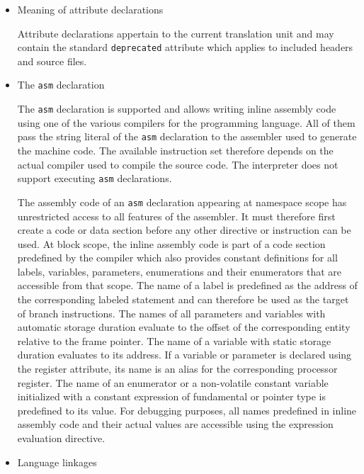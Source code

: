 \label{sec:cppdeclarations}

\begin{itemize}

\item Meaning of attribute declarations 

Attribute declarations appertain to the current translation unit and may contain the standard \texttt{deprecated} attribute which applies to included headers and source files.

\item The \texttt{asm} declaration 

The \texttt{asm} declaration is supported and allows writing inline assembly code using one of the various compilers for the \cpp{} programming language.
All of them pass the string literal of the \texttt{asm} declaration to the assembler used to generate the machine code.
The available instruction set therefore depends on the actual compiler used to compile the source code.
\seeassembly
The interpreter does not support executing \texttt{asm} declarations.

The assembly code of an \texttt{asm} declaration appearing at namespace scope has unrestricted access to all features of the assembler.
It must therefore first create a code or data section before any other directive or instruction can be used.
At block scope, the inline assembly code is part of a code section predefined by the compiler which also provides constant definitions for all labels, variables, parameters, enumerations and their enumerators that are accessible from that scope.
The name of a label is predefined as the address of the corresponding labeled statement and can therefore be used as the target of branch instructions.
The names of all parameters and variables with automatic storage duration evaluate to the offset of the corresponding entity relative to the frame pointer.
The name of a variable with static storage duration evaluates to its address.
If a variable or parameter is declared using the register attribute, its name is an alias for the corresponding processor register.
The name of an enumerator or a non-volatile constant variable initialized with a constant expression of fundamental or pointer type is predefined to its value.
For debugging purposes, all names predefined in inline assembly code and their actual values are accessible using the expression evaluation directive.

\item Language linkages 


\end{itemize}
